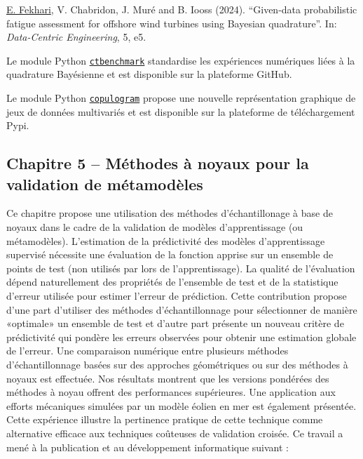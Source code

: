 \medskip
\noindent
{} \underline{E. Fekhari}, V. Chabridon, J. Mur\'{e} and B. Iooss (2024). ``Given-data probabilistic fatigue assessment for offshore wind turbines using Bayesian quadrature''. In: \textit{Data-Centric Engineering}, 5, e5.

\medskip
\noindent
{} Le module Python \href{https://github.com/efekhari27/ctbenchmark}{\texttt{ctbenchmark}} standardise les exp\'{e}riences num\'{e}riques li\'{e}es à la quadrature Bay\'{e}sienne et est disponible sur la plateforme GitHub.

\medskip
\noindent
{} Le module Python \href{https://github.com/efekhari27/copulogram}{\texttt{copulogram}} propose une nouvelle repr\'{e}sentation graphique de jeux de donn\'{e}es multivari\'{e}s et est disponible sur la plateforme de t\'{e}l\'{e}chargement Pypi.



\subsection*{Chapitre 5 -- M\'{e}thodes à noyaux pour la validation de m\'{e}tamodèles}

Ce chapitre propose une utilisation des m\'{e}thodes d'\'{e}chantillonage à base de noyaux dans le cadre de la validation de modèles d'apprentissage (ou m\'{e}tamodèles). 
L'estimation de la pr\'{e}dictivit\'{e} des modèles d'apprentissage supervis\'{e} n\'{e}cessite une \'{e}valuation de la fonction apprise sur un ensemble de points de test (non utilis\'{e}s par lors de l'apprentissage). 
La qualit\'{e} de l'\'{e}valuation d\'{e}pend naturellement des propri\'{e}t\'{e}s de l'ensemble de test et de la statistique d'erreur utilis\'{e}e pour estimer l'erreur de pr\'{e}diction. 
Cette contribution propose d'une part d'utiliser des m\'{e}thodes d'\'{e}chantillonnage pour s\'{e}lectionner de manière «optimale» un ensemble de test et d'autre part pr\'{e}sente un nouveau critère de pr\'{e}dictivit\'{e} qui pondère les erreurs observ\'{e}es pour obtenir une estimation globale de l'erreur. 
Une comparaison num\'{e}rique entre plusieurs m\'{e}thodes d'\'{e}chantillonnage bas\'{e}es sur des approches g\'{e}om\'{e}triques \citep{shang_apley_2020} ou sur des m\'{e}thodes à noyaux \citep{chen_welling_2010,mak_joseph_2018} est effectu\'{e}e. 
Nos r\'{e}sultats montrent que les versions pond\'{e}r\'{e}es des m\'{e}thodes à noyau offrent des performances sup\'{e}rieures. 
Une application aux efforts m\'{e}caniques simul\'{e}es par un modèle \'{e}olien en mer est \'{e}galement pr\'{e}sent\'{e}e. 
Cette exp\'{e}rience illustre la pertinence pratique de cette technique comme alternative efficace aux techniques coûteuses de validation crois\'{e}e. 
Ce travail a men\'{e} à la publication et au d\'{e}veloppement informatique suivant : 

